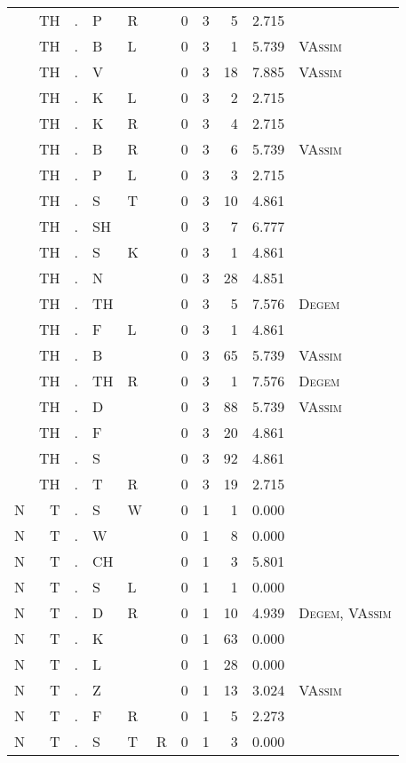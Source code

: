 \begin{longtable}{r@{ } r@{ } c@{ } l@{ } l@{ } l@{ } r r r r l }
 & TH & . & P & R &  & 0 & 3 & 5 & 2.715 &  \\
 & TH & . & B & L &  & 0 & 3 & 1 & 5.739 & \textsc{VAssim} \\
 & TH & . & V &  &  & 0 & 3 & 18 & 7.885 & \textsc{VAssim} \\
 & TH & . & K & L &  & 0 & 3 & 2 & 2.715 &  \\
 & TH & . & K & R &  & 0 & 3 & 4 & 2.715 &  \\
 & TH & . & B & R &  & 0 & 3 & 6 & 5.739 & \textsc{VAssim} \\
 & TH & . & P & L &  & 0 & 3 & 3 & 2.715 &  \\
 & TH & . & S & T &  & 0 & 3 & 10 & 4.861 &  \\
 & TH & . & SH &  &  & 0 & 3 & 7 & 6.777 &  \\
 & TH & . & S & K &  & 0 & 3 & 1 & 4.861 &  \\
 & TH & . & N &  &  & 0 & 3 & 28 & 4.851 &  \\
 & TH & . & TH &  &  & 0 & 3 & 5 & 7.576 & \textsc{Degem} \\
 & TH & . & F & L &  & 0 & 3 & 1 & 4.861 &  \\
 & TH & . & B &  &  & 0 & 3 & 65 & 5.739 & \textsc{VAssim} \\
 & TH & . & TH & R &  & 0 & 3 & 1 & 7.576 & \textsc{Degem} \\
 & TH & . & D &  &  & 0 & 3 & 88 & 5.739 & \textsc{VAssim} \\
 & TH & . & F &  &  & 0 & 3 & 20 & 4.861 &  \\
 & TH & . & S &  &  & 0 & 3 & 92 & 4.861 &  \\
 & TH & . & T & R &  & 0 & 3 & 19 & 2.715 &  \\
N & T & . & S & W &  & 0 & 1 & 1 & 0.000 &  \\
N & T & . & W &  &  & 0 & 1 & 8 & 0.000 &  \\
N & T & . & CH &  &  & 0 & 1 & 3 & 5.801 &  \\
N & T & . & S & L &  & 0 & 1 & 1 & 0.000 &  \\
N & T & . & D & R &  & 0 & 1 & 10 & 4.939 & \textsc{Degem}, \textsc{VAssim} \\
N & T & . & K &  &  & 0 & 1 & 63 & 0.000 &  \\
N & T & . & L &  &  & 0 & 1 & 28 & 0.000 &  \\
N & T & . & Z &  &  & 0 & 1 & 13 & 3.024 & \textsc{VAssim} \\
N & T & . & F & R &  & 0 & 1 & 5 & 2.273 &  \\
N & T & . & S & T & R & 0 & 1 & 3 & 0.000 &  \\

\end{longtable}
